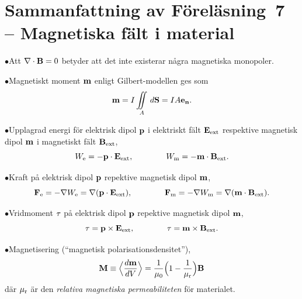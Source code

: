 \section{Sammanfattning av F{\"o}rel{\"a}sning~7
  -- Magnetiska f{\"a}lt i material}
\item{$\bullet$}{Att $\nabla\cdot{\bf B}=0$ betyder att det inte existerar
  n{\aa}gra magnetiska monopoler.}
\item{$\bullet$}{Magnetiskt moment ${\bf m}$ enligt Gilbert-modellen ges som
$$
{\bf m}=I\iint_A\,d{\bf S}=IA{\bf e}_{\bf n}.
$$}
\item{$\bullet$}{Upplagrad energi f{\"o}r elektrisk dipol ${\bf p}$ i
  elektriskt f{\"a}lt ${\bf E}_{\rm ext}$ respektive magnetisk dipol ${\bf m}$
  i magnetiskt f{\"a}lt ${\bf B}_{\rm ext}$,
  $$
    W_{\rm e} = -{\bf p}\cdot{\bf E}_{\rm ext},\qquad\qquad
    W_{\rm m} = -{\bf m}\cdot{\bf B}_{\rm ext}.
  $$}
\item{$\bullet$}{Kraft p{\aa} elektrisk dipol ${\bf p}$ repektive magnetisk
  dipol ${\bf m}$,
  $$
    {\bf F}_{\rm e} = -\nabla W_{\rm e}
      =\nabla({\bf p}\cdot{\bf E}_{\rm ext}),\qquad\qquad
    {\bf F}_{\rm m} = -\nabla W_{\rm m}
      =\nabla({\bf m}\cdot{\bf B}_{\rm ext}).
  $$}
\item{$\bullet$}{Vridmoment ${\bf\tau}$ p{\aa} elektrisk dipol ${\bf p}$
  repektive magnetisk dipol ${\bf m}$,
  $$
    {\bf \tau}={\bf p}\times{\bf E}_{\rm ext},\qquad\qquad
    {\bf \tau}={\bf m}\times{\bf B}_{\rm ext}.
  $$}
\item{$\bullet$}{Magnetisering (``magnetisk polarisationsdensitet''),
  $$
    {\bf M} \equiv \Big\langle{{d{\bf m}}\over{dV}}\Big\rangle
      = {{1}\over{\mu_0}}\Big(1-{{1}\over{\mu_{\rm r}}}\Big){\bf B}
  $$
  d{\"a}r $\mu_{\rm r}$ {\"a}r den {\it relativa magnetiska permeabiliteten}
  f{\"o}r materialet.}

